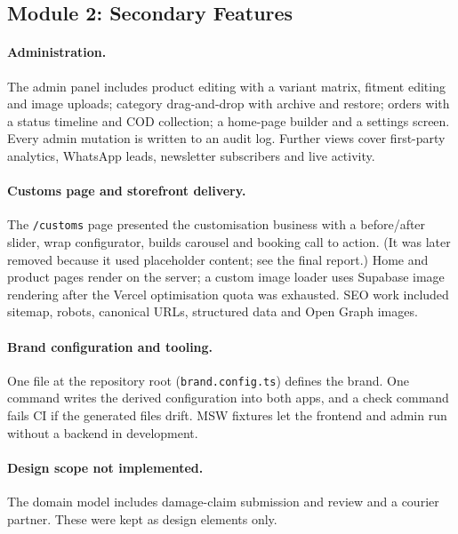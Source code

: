 \documentclass{tietreport}
\begin{document}
\subsection{Module 2: Secondary Features}

\paragraph{Administration.}
The admin panel includes product editing with a variant matrix, fitment
editing and image uploads; category drag-and-drop with archive and restore;
orders with a status timeline and COD collection; a home-page builder and a
settings screen. Every admin mutation is written to an audit log. Further
views cover first-party analytics, WhatsApp leads, newsletter subscribers and
live activity.

\paragraph{Customs page and storefront delivery.}
The \texttt{/customs} page presented the customisation business with a
before/after slider, wrap configurator, builds carousel and booking call to
action. (It was later removed because it used placeholder content; see the
final report.) Home and product pages render on the server; a custom image
loader uses Supabase image rendering after the Vercel optimisation quota was
exhausted. SEO work included sitemap, robots, canonical URLs, structured data
and Open Graph images.

\paragraph{Brand configuration and tooling.}
One file at the repository root (\texttt{brand.config.ts}) defines the
brand. One command writes the derived configuration into both apps, and a
check command fails CI if the generated files drift. MSW fixtures let the frontend and admin run without a backend in
development.

\paragraph{Design scope not implemented.}
The domain model includes damage-claim submission and review and a courier
partner. These were kept as design elements only.
\end{document}
